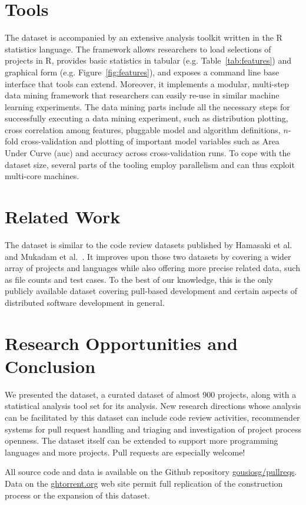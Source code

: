 \documentclass{sig-alternate}
\begin{document}
\section{Tools}

The \pullreqs dataset is accompanied by an extensive analysis toolkit written in
the R statistics language. The framework allows researchers to load selections
of projects in R, provides basic statistics in tabular (e.g.
Table~\ref{tab:features}) and graphical form (e.g. Figure~\ref{fig:features}),
and exposes a command line base interface that tools can extend. Moreover,
it implements a modular, multi-step data mining framework that researchers
can easily re-use in similar machine learning experiments. The data mining
parts include all the necessary steps for successfully executing a data mining
experiment, such as distribution plotting, cross correlation among features,
pluggable model and algorithm definitions, $n$-fold cross-validation and
plotting of important model variables such as Area Under Curve ({\sc auc}) and
accuracy across cross-validation runs. To cope with the \pullreqs dataset
size, several parts of the tooling employ parallelism and can thus exploit
multi-core machines.

\section{Related Work}
\label{sec:rel}

The \pullreqs dataset is similar to the code review datasets published by
Hamasaki et al.~\cite{Hamas13} and Mukadam et al.~\cite{Mukad13}.  It improves
upon those two datasets by covering a wider array of projects and languages
while also offering more precise related data, such as file counts and test
cases. To the best of our knowledge, this is the only publicly available
dataset covering pull-based development and certain aspects of distributed
software development in general.

\section{Research Opportunities and Conclusion}

We presented the \pullreqs dataset, a curated dataset of almost 900 projects,
along with a statistical analysis tool set for its analysis. New research directions whose analysis can be facilitated
by this dataset can include code review activities, recommender systems for pull
request handling and triaging and investigation of project process openness. The
dataset itself can be extended to support more programming languages and more
projects. Pull requests are especially welcome!

All source code and data is available on the Github repository
\href{https://github.com/gousiosg/pullreqs}{gousiosg/pullreqs}. Data on the
\href{http://ghtorrent.org}{ghtorrent.org} web site permit full replication
of the construction process or the expansion of this dataset.


\balance

  
\end{document}
